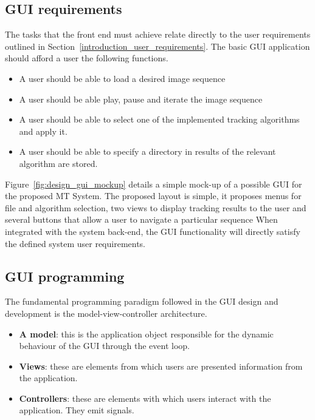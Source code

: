 \subsection{GUI requirements}
The tasks that the front end must achieve relate directly to the user
requirements outlined in Section~\ref{introduction_user_requirements}. The basic
GUI application should afford a user the following functions.  

\begin{itemize}
    \item A user should be able to load a desired image sequence
    \item A user should be able play, pause and iterate the image sequence 
    \item A user should be able to select one of the implemented tracking
        algorithms and apply it.
    \item A user should be able to specify a directory in results of the
        relevant algorithm are stored.
\end{itemize}

Figure~\ref{fig:design_gui_mockup} details a simple mock-up of a possible GUI
for the proposed MT System. The proposed layout is simple, it proposes menus for
file and algorithm selection, two views to display tracking results to the user
and several buttons that allow a user to navigate a particular sequence
When integrated with the system back-end, the GUI functionality will directly
satisfy the defined system user requirements.


\subsection{GUI programming}
The fundamental programming paradigm followed in the GUI design and development
is the model-view-controller architecture\cite{wiki:mvc,Summerfield}. 
\begin{itemize}
    \item \textbf{A model}: this is the application object responsible for the
        dynamic behaviour of the GUI through the event loop.
    \item \textbf{Views}: these are elements from which users are presented
        information from the application. 
    \item \textbf{Controllers}: these are elements with which users interact with
        the application. They emit signals.
\end{itemize}

